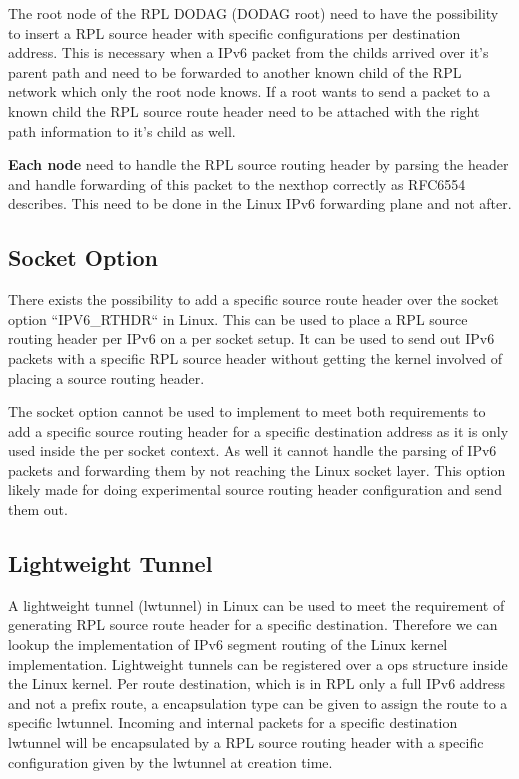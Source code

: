 \documentclass[letterpaper]{article}
\begin{document}
The root node of the RPL DODAG (DODAG root) need to have the possibility to insert a RPL source header with specific configurations per destination address.
This is necessary when a IPv6 packet from the childs arrived over it's parent path and need to be forwarded to another known child of the RPL network which only the root node knows.
If a root wants to send a packet to a known child the RPL source route header need to be attached with the right path information to it's child as well.

{\bf Each node} need to handle the RPL source routing header by parsing the header and handle forwarding of this packet to the nexthop correctly as RFC6554 describes.
This need to be done in the Linux IPv6 forwarding plane and not after.

\subsection{Socket Option}

There exists the possibility to add a specific source route header over the socket option ``IPV6\_RTHDR`` in Linux.
This can be used to place a RPL source routing header per IPv6 on a per socket setup.
It can be used to send out IPv6 packets with a specific RPL source header without getting the kernel involved of placing a source routing header.

The socket option cannot be used to implement to meet both requirements to add a specific source routing header for a specific destination address as it is only used inside the per socket context.
As well it cannot handle the parsing of IPv6 packets and forwarding them by not reaching the Linux socket layer.
This option likely made for doing experimental source routing header configuration and send them out.

\subsection{Lightweight Tunnel}

A lightweight tunnel (lwtunnel) in Linux can be used to meet the requirement of generating RPL source route header for a specific destination.
Therefore we can lookup the implementation of IPv6 segment routing \cite{srh} of the Linux kernel implementation.
Lightweight tunnels can be registered over a ops structure inside the Linux kernel.
Per route destination, which is in RPL only a full IPv6 address and not a prefix route, a encapsulation type can be given to assign the route to a specific lwtunnel.
Incoming and internal packets for a specific destination lwtunnel will be encapsulated by a RPL source routing header with a specific configuration given by the lwtunnel at creation time.
\end{document}
